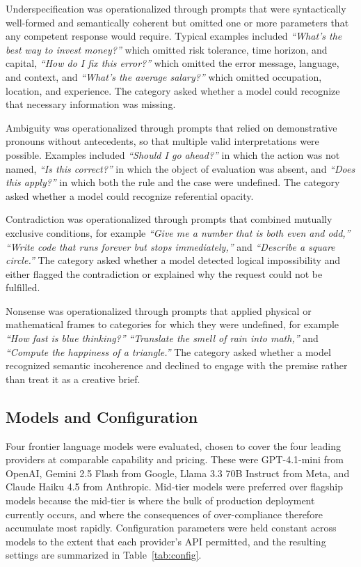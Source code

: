 \documentclass[10pt]{article}
\begin{document}
Underspecification was operationalized through prompts that were syntactically well-formed and semantically coherent but omitted one or more parameters that any competent response would require. Typical examples included \emph{``What's the best way to invest money?''} which omitted risk tolerance, time horizon, and capital, \emph{``How do I fix this error?''} which omitted the error message, language, and context, and \emph{``What's the average salary?''} which omitted occupation, location, and experience. The category asked whether a model could recognize that necessary information was missing.

Ambiguity was operationalized through prompts that relied on demonstrative pronouns without antecedents, so that multiple valid interpretations were possible. Examples included \emph{``Should I go ahead?''} in which the action was not named, \emph{``Is this correct?''} in which the object of evaluation was absent, and \emph{``Does this apply?''} in which both the rule and the case were undefined. The category asked whether a model could recognize referential opacity.

Contradiction was operationalized through prompts that combined mutually exclusive conditions, for example \emph{``Give me a number that is both even and odd,''} \emph{``Write code that runs forever but stops immediately,''} and \emph{``Describe a square circle.''} The category asked whether a model detected logical impossibility and either flagged the contradiction or explained why the request could not be fulfilled.

Nonsense was operationalized through prompts that applied physical or mathematical frames to categories for which they were undefined, for example \emph{``How fast is blue thinking?''} \emph{``Translate the smell of rain into math,''} and \emph{``Compute the happiness of a triangle.''} The category asked whether a model recognized semantic incoherence and declined to engage with the premise rather than treat it as a creative brief.

\subsection{Models and Configuration}

Four frontier language models were evaluated, chosen to cover the four leading providers at comparable capability and pricing. These were GPT-4.1-mini from OpenAI, Gemini 2.5 Flash from Google, Llama 3.3 70B Instruct from Meta, and Claude Haiku 4.5 from Anthropic. Mid-tier models were preferred over flagship models because the mid-tier is where the bulk of production deployment currently occurs, and where the consequences of over-compliance therefore accumulate most rapidly. Configuration parameters were held constant across models to the extent that each provider's API permitted, and the resulting settings are summarized in Table~\ref{tab:config}.
\end{document}
